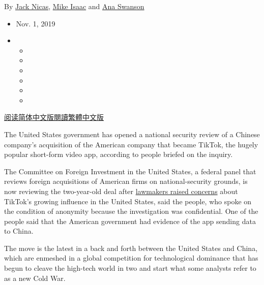 By \href{https://www.nytimes3xbfgragh.onion/by/jack-nicas}{Jack Nicas},
\href{https://www.nytimes3xbfgragh.onion/by/mike-isaac}{Mike Isaac} and
\href{https://www.nytimes3xbfgragh.onion/by/ana-swanson}{Ana Swanson}

\begin{itemize}
\item
  Nov. 1, 2019
\item
  \begin{itemize}
  \item
  \item
  \item
  \item
  \item
  \item
  \end{itemize}
\end{itemize}

\href{https://cn.nytimes3xbfgragh.onion/technology/20191104/tiktok-national-security-review/}{阅读简体中文版}\href{https://cn.nytimes3xbfgragh.onion/technology/20191104/tiktok-national-security-review/zh-hant/}{閱讀繁體中文版}

The United States government has opened a national security review of a
Chinese company's acquisition of the American company that became
TikTok, the hugely popular short-form video app, according to people
briefed on the inquiry.

The Committee on Foreign Investment in the United States, a federal
panel that reviews foreign acquisitions of American firms on
national-security grounds, is now reviewing the two-year-old deal after
\href{https://www.rubio.senate.gov/public/_cache/files/9ba023e4-2f4b-404a-a8c0-e87ea784f440/FCEFFE1F54F3899795B4E5F1F1804630.20191009-letter-to-secretary-mnuchin-re-tiktok.pdf}{lawmakers
raised concerns} about TikTok's growing influence in the United States,
said the people, who spoke on the condition of anonymity because the
investigation was confidential. One of the people said that the American
government had evidence of the app sending data to China.

The move is the latest in a back and forth between the United States and
China, which are enmeshed in a global competition for technological
dominance that has begun to cleave the high-tech world in two and start
what some analysts refer to as a new Cold War.

